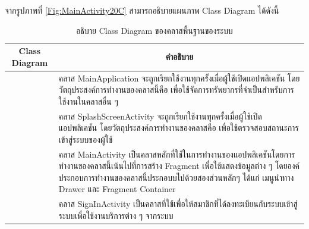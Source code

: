 \newpage	
	จากรูปภาพที่ \ref{Fig:MainActivity20C} สามารถอธิบายแผนภาพ Class Diagram ได้ดังนี้
	\begin{table}[H]
		\centering
		\caption{อธิบาย Class Diagram ของคลาสพื้นฐานของระบบ}
		\label{tab:class}
		\begin{tabular}{|c|p{10cm}|}
			\hline
			\textbf{Class Diagram} & \multicolumn{1}{c|}{\textbf{คำอธิบาย}} \\ \hline
			\raisebox{-\totalheight}{MainApplication}
			& \setstretch{1.5} {คลาส MainApplication จะถูกเรียกใช้งานทุกครั้งเมื่อผู้ใช้เปิดแอปพลิเคชัน โดยวัตถุประสงค์การทำงานของคลาสนี้คือ เพื่อใช้จัดการทรัพยากรที่จำเป็นสำหรับการใช้งานในคลาสอื่น ๆ } \\ \hline
			\raisebox{-\totalheight}{SplashScreenActivity}
			& \setstretch{1.5} {คลาส SplashScreenActivity จะถูกเรียกใช้งานทุกครั้งเมื่อผู้ใช้เปิดแอปพลิเคชัน โดยวัตถุประสงค์การทำงานของคลาสคือ เพื่อใช้ตรวจสอบสถานะการเข้าสู่ระบบของผู้ใช้} \\ \hline
			\raisebox{-\totalheight}{MainActivity}
			& \setstretch{1.5} {คลาส MainActivity เป็นคลาสหลักที่ใช้ในการทำงานของแอปพลิเคชันโดยการทำงานของคลาสนี้เน้นไปที่การสร้าง Fragment เพื่อใช้แสดงข้อมูลต่าง ๆ โดยองค์ประกอบการทำงานของคลาสนี้ประกอบบไปด้วยสองส่วนหลักๆ ได้แก่ เมนูนำทาง Drawer และ Fragment Container} \\ \hline
			\raisebox{-\totalheight}{SignInActivity}
			& \setstretch{1.5} {คลาส SignInActivity เป็นคลาสที่ใช้เพื่อให้สมาชิกที่ได้ลงทะเบียนกับระบบเข้าสู่ระบบเพื่อใช้งานบริการต่าง ๆ จากระบบ} \\ \hline
	\end{tabular}
\end{table}

